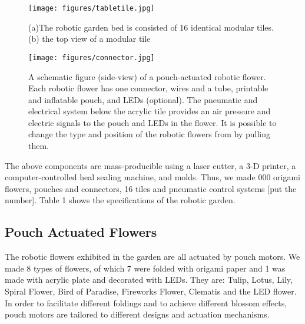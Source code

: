 \documentclass[letterpaper, 10 pt, conference]{ieeeconf}  %
\begin{document}
\begin{figure}[thpb]
	\centering
	\texttt{[image: figures/tabletile.jpg]}
	\caption{(a)The robotic garden bed is consisted of 16 identical modular tiles. (b) the top view of a modular tile}
	\label{tabletile}
\end{figure}

\begin{figure}[thpb]
	\centering
	\texttt{[image: figures/connector.jpg]}
	\caption{A schematic figure (side-view) of a pouch-actuated robotic flower. Each robotic flower has one connector, wires and a tube, printable and inflatable pouch, and LEDs (optional). The pneumatic and electrical system below the acrylic tile provides an air pressure and electric signals to the pouch and LEDs in the flower. It is possible to change the type and position of the robotic flowers from by pulling them. }
	\label{connector}
\end{figure}   

The above components are mass-producible using a laser cutter, a 3-D printer, a computer-controlled heal sealing machine, and molds.  Thus, we made 000 origami flowers, pouches and connectors, 16 tiles and pneumatic control systems [put the number]. Table 1 shows the specifications of the robotic garden. 

\subsection{Pouch Actuated Flowers}

The robotic flowers exhibited in the garden are all actuated by pouch motors. We made 8 types of flowers, of which 7 were folded with origami paper and 1 was made with acrylic plate and decorated with LEDs. They are: Tulip, Lotus, Lily, Spiral Flower, Bird of Paradise, Fireworks Flower, Clematis and the LED flower. In order to facilitate different foldings and to achieve different blossom effects, pouch motors are tailored to different designs and actuation mechanisms.
\end{document}
